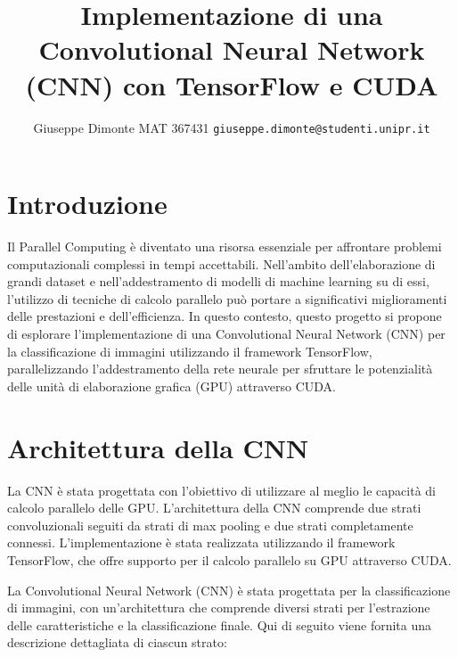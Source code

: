 \documentclass{article}
\title{Implementazione di una Convolutional Neural Network (CNN) con TensorFlow e CUDA}
\author{%
  Giuseppe Dimonte MAT 367431 \texttt{giuseppe.dimonte@studenti.unipr.it}
}
\date{}
\begin{document}
\maketitle

\section{Introduzione}
Il Parallel Computing è diventato una risorsa essenziale per affrontare problemi computazionali complessi in tempi accettabili. Nell'ambito dell'elaborazione di grandi dataset e nell'addestramento di modelli di machine learning su di essi, l'utilizzo di tecniche di calcolo parallelo può portare a significativi miglioramenti delle prestazioni e dell'efficienza. In questo contesto, questo progetto si propone di esplorare l'implementazione di una Convolutional Neural Network (CNN) per la classificazione di immagini utilizzando il framework TensorFlow, parallelizzando l'addestramento della rete neurale per sfruttare le potenzialità delle unità di elaborazione grafica (GPU) attraverso CUDA.

\section{Architettura della CNN}
La CNN è stata progettata con l'obiettivo di utilizzare al meglio le capacità di calcolo parallelo delle GPU. L'architettura della CNN comprende due strati convoluzionali seguiti da strati di max pooling e due strati completamente connessi. L'implementazione è stata realizzata utilizzando il framework TensorFlow, che offre supporto per il calcolo parallelo su GPU attraverso CUDA.

La Convolutional Neural Network (CNN) è stata progettata per la classificazione di immagini, con un'architettura che comprende diversi strati per l'estrazione delle caratteristiche e la classificazione finale. Qui di seguito viene fornita una descrizione dettagliata di ciascun strato:
\end{document}
